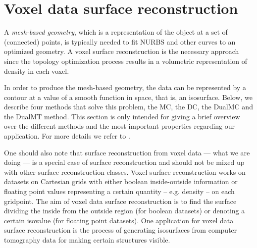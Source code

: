 \section{Voxel data surface reconstruction}
\label{sec:surfaceBackg}
A \emph{mesh-based geometry}, which is a representation of the object at a set of (connected) points, is typically needed to fit \ac{NURBS} and other curves to an optimized geometry. A voxel surface reconstruction is the necessary approach since the topology optimization process results in a volumetric representation of density in each voxel. 

In order to produce the mesh-based geometry, the data can be represented by a contour at a value of a smooth function in space, that is, an isosurface. Below, we describe four  methods that solve this problem, the \acl{MC}, the \acl{DC}, the \acl{DualMC} and the \acl{DualMT} method. This section is only intended for giving a brief overview over the different methods and the most important properties regarding our application. For more details we refer to \cite{Marching2006, Hermite2002, Nielson2004, Nielson2008}. 

One should also note that surface reconstruction from voxel data --- what we are doing --- is a special case of surface reconstruction and should not be mixed up with other surface reconstruction classes. Voxel surface reconstruction works on datasets on Cartesian grids with either boolean inside-outside information or floating point values representing a certain quantity -- e.g. density -- on each gridpoint. The aim of voxel data surface reconstruction is to find the surface dividing the inside from the outside region (for boolean datasets) or denoting a certain isovalue (for floating point datasets). One application for voxel data surface reconstruction is the process of generating isosurfaces from computer tomography data for making certain structures visible.





